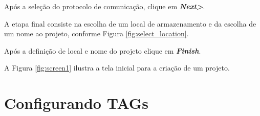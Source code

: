 Após a seleção do protocolo de comunicação, 
clique em \textbf{\textit{Next>}}.

A etapa final consiste na escolha de um local de armazenamento
e da escolha de um nome ao projeto, 
conforme Figura \ref{fig:select_location}.

\begin{figure}[ht!]
	\centering
\end{figure}

Após a definição de local e nome do projeto 
clique em \textbf{\textit{Finish}}.

A Figura \ref{fig:screen1} 
ilustra a tela inicial para a criação de um projeto. 


\begin{figure}[ht!]
	\centering
\end{figure}





\section{Configurando TAGs}



